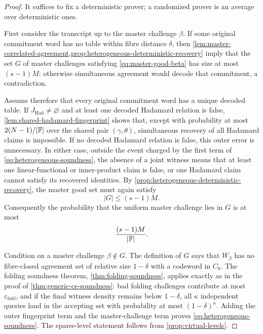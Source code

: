 \begin{proof}
It suffices to fix a deterministic prover; a randomized prover is an average over deterministic ones.

First consider the transcript up to the master challenge $\beta$.  If some original commitment word has no table within fibre distance $\delta$, then \cref{lem:master-correlated-agreement,prop:heterogeneous-deterministic-recovery} imply that the set $G$ of master challenges satisfying \eqref{eq:master-good-beta} has size at most $(s-1)M$: otherwise simultaneous agreement would decode that commitment, a contradiction.

Assume therefore that every original commitment word has a unique decoded table.  If $J_{\mathrm{Had}}\ne\varnothing$ and at least one decoded Hadamard relation is false, \cref{lem:shared-hadamard-fingerprint} shows that, except with probability at most $2(N-1)/|\mathbb{F}|$ over the shared pair $(\gamma,\theta)$, simultaneous recovery of all Hadamard claims is impossible.  If no decoded Hadamard relation is false, this outer error is unnecessary.  In either case, outside the event charged by the first term of \eqref{eq:heterogeneous-soundness}, the absence of a joint witness means that at least one linear-functional or inner-product claim is false, or one Hadamard claim cannot satisfy its recovered identities.  By \cref{prop:heterogeneous-deterministic-recovery}, the master good set must again satisfy
\begin{equation}
  |G|\le(s-1)M.
  \label{eq:heterogeneous-good-set-bound}
\end{equation}
Consequently the probability that the uniform master challenge lies in $G$ is at most
\[
  \frac{(s-1)M}{|\mathbb{F}|}.
\]

Condition on a master challenge $\beta\notin G$.  The definition of $G$ says that $W_\beta$ has no fibre-closed agreement set of relative size $1-\delta$ with a codeword in $C_0$.  The folding soundness theorem, \cref{thm:folding-soundness}, applies exactly as in the proof of \cref{thm:generic-ce-soundness}: bad folding challenges contribute at most $\varepsilon_{\mathrm{fold}}$, and if the final witness density remains below $1-\delta$, all $\kappa$ independent queries land in the accepting set with probability at most $(1-\delta)^\kappa$.  Adding the outer fingerprint term and the master-challenge term proves \eqref{eq:heterogeneous-soundness}.  The sparse-level statement follows from \cref{prop:virtual-levels}.
\end{proof}

